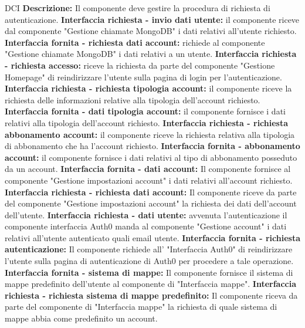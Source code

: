 \begin{listaPersonale}{DCI}
    \textbf{Descrizione:}  Il componente deve gestire la procedura di richiesta di autenticazione.
    \textbf{Interfaccia richiesta - invio dati utente:} il componente riceve dal componente "Gestione chiamate MongoDB" i dati relativi all'utente richiesto.
    \textbf{Interfaccia fornita - richiesta dati account:} richiede al componente "Gestione chiamate MongoDB" i dati relativi a un utente.
    \textbf{Interfaccia richiesta - richiesta accesso:} riceve la richiesta da parte del componente "Gestione Homepage" di reindirizzare l'utente sulla pagina di login per l'autenticazione.
    \textbf{Interfaccia richiesta - richiesta tipologia account:} il componente riceve la richiesta delle informazioni relative alla tipologia dell'account richiesto.
    \textbf{Interfaccia fornita - dati tipologia account:} il componente fornisce i dati relativi alla tipologia dell'account richiesto.
    \textbf{Interfaccia richiesta - richiesta abbonamento account:} il componente riceve la richiesta relativa alla tipologia di abbonamento che ha l'account richiesto.
    \textbf{Interfaccia fornita - abbonamento account:} il componente fornisce i dati relativi al tipo di abbonamento posseduto da un account.
    \textbf{Interfaccia fornita - dati account:} Il componente fornisce al componente "Gestione impostazioni account" i dati relativi all'account richiesto.
    \textbf{Interfaccia richiesta - richiesta dati account:} Il componente riceve da parte del componente "Gestione impostazioni account" la richiesta dei dati dell'account dell'utente.
    \textbf{Interfaccia richiesta - dati utente:} avvenuta l'autenticazione il componente interfaccia Auth0 manda al componente "Gestione account" i dati relativi all'utente autenticato quali email utente.
    \textbf{Interfaccia fornita - richiesta autenticazione:} Il componente richiede all' "Interfaccia Auth0" di reindirizzare l'utente sulla pagina di autenticazione di Auth0 per procedere a tale operazione.
    \textbf{Interfaccia fornita - sistema di mappe:} Il componente fornisce il sistema di mappe predefinito dell'utente al componente di "Interfaccia mappe".
    \textbf{Interfaccia richiesta - richiesta sistema di mappe predefinito:} Il componente riceva da parte del componente di "Interfaccia mappe" la richiesta di quale sistema di mappe abbia come predefinito un account.



\end{listaPersonale}
